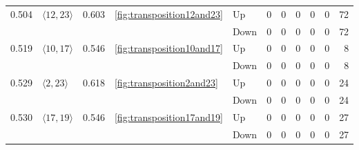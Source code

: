 \documentclass{article}
\begin{document}
\begin{center}
\begin{tabular}{lllllrrrrrr}
\multirow[t]{2}{*}{0.504} & \multirow[t]{2}{*}{$\langle12, 23\rangle$} & \multirow[t]{2}{*}{0.603} & \multirow[t]{2}{*}{\ref{fig:transposition12and23}} & Up & 0 & 0 & 0 & 0 & 0 & 72 \\
 &  &  &  & Down & 0 & 0 & 0 & 0 & 0 & 72 \\
\cline{1-11} \cline{2-11} \cline{3-11} \cline{4-11}
\multirow[t]{2}{*}{0.519} & \multirow[t]{2}{*}{$\langle10, 17\rangle$} & \multirow[t]{2}{*}{0.546} & \multirow[t]{2}{*}{\ref{fig:transposition10and17}} & Up & 0 & 0 & 0 & 0 & 0 & 8 \\
 &  &  &  & Down & 0 & 0 & 0 & 0 & 0 & 8 \\
\cline{1-11} \cline{2-11} \cline{3-11} \cline{4-11}
\multirow[t]{2}{*}{0.529} & \multirow[t]{2}{*}{$\langle2, 23\rangle$} & \multirow[t]{2}{*}{0.618} & \multirow[t]{2}{*}{\ref{fig:transposition2and23}} & Up & 0 & 0 & 0 & 0 & 0 & 24 \\
 &  &  &  & Down & 0 & 0 & 0 & 0 & 0 & 24 \\
\cline{1-11} \cline{2-11} \cline{3-11} \cline{4-11}
\multirow[t]{2}{*}{0.530} & \multirow[t]{2}{*}{$\langle17, 19\rangle$} & \multirow[t]{2}{*}{0.546} & \multirow[t]{2}{*}{\ref{fig:transposition17and19}} & Up & 0 & 0 & 0 & 0 & 0 & 27 \\
 &  &  &  & Down & 0 & 0 & 0 & 0 & 0 & 27 \\
\cline{1-11} \cline{2-11} \cline{3-11} \cline{4-11}
\bottomrule
\end{tabular}


\end{center}
\end{document}
